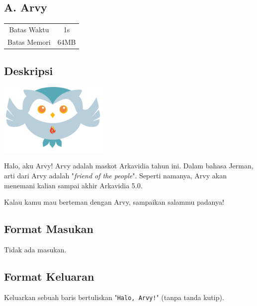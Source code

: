 \documentclass{article}
\begin{document}
\begin{center}
    \section*{A. Arvy} %

    \begin{tabular}{ | c c | }
        \hline
        Batas Waktu  & 1s \\    %
        Batas Memori & 64MB \\  %
        \hline
    \end{tabular}
\end{center}

\subsection*{Deskripsi}

\begin{center}
\includegraphics[width=200px]{arvy}
\end{center}

Halo, aku Arvy!
Arvy adalah maskot Arkavidia tahun ini.
Dalam bahasa Jerman, arti dari Arvy adalah "\textit{friend of the people}".
Seperti namanya, Arvy akan menemani kalian sampai akhir Arkavidia 5.0.

Kalau kamu mau berteman dengan Arvy, sampaikan salammu padanya!

\subsection*{Format Masukan}

Tidak ada masukan.

\subsection*{Format Keluaran}

Keluarkan sebuah baris bertuliskan "\lstinline{Halo, Arvy!}" (tanpa tanda kutip).
\\
\end{document}
